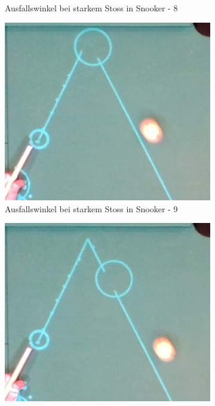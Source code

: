 \begin{figure}[h!]
\begin{subfigure}[t]{0.2\textwidth}
        \caption{Ausfallswinkel bei starkem Stoss in Snooker - 8}
        \label{fig:rebound_angle_fast_snooker_8}
    \end{subfigure}
    \hfill
    \begin{subfigure}[t]{0.2\textwidth}
        \centering
        \includegraphics[width=1.0\linewidth]{../common/04_results/resources/simulation/rebound_angle_fast_snooker/00_rail_rebound_angle_fast_snooker_09.png}
        \caption{Ausfallswinkel bei starkem Stoss in Snooker - 9}
        \label{fig:rebound_angle_fast_snooker_9}
    \end{subfigure}
    \hfill
    \begin{subfigure}[t]{0.2\textwidth}
        \centering
        \includegraphics[width=1.0\linewidth]{../common/04_results/resources/simulation/rebound_angle_fast_snooker/00_rail_rebound_angle_fast_snooker_10.png}

\end{subfigure}
\end{figure}
